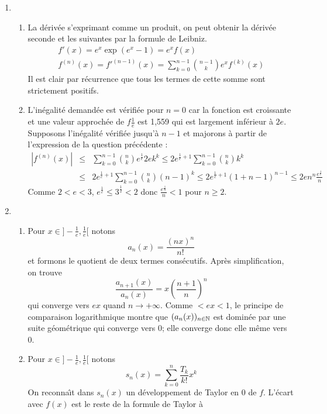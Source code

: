 \begin{enumerate}
\item \begin{enumerate}
       \item La d{\'e}riv{\'e}e s'exprimant comme un produit, on peut obtenir la d{\'e}riv{\'e}e seconde et les suivantes par la formule de Leibniz.
\begin{eqnarray*}
f'(x)=e^{x}\exp (e^{x}-1)=e^{x}f(x)\\
f^{(n)}(x)=f'^{(n-1)}(x)=\sum_{k=0}^{n-1}\binom{ n-1}{k}e^{x}f^{(k)}(x)
\end{eqnarray*}
Il est clair par r{\'e}currence que tous les termes de cette somme sont strictement positifs.
      \item L'in{\'e}galit{\'e} demand{\'e}e est v{\'e}rifi{\'e}e pour $n=0$ car la fonction est croissante et une valeur approch{\'e}e de $f\frac{1}{e}$ est 1,559 qui est largement inf{\'e}rieur {\`a} $2e$. Supposons l'in{\'e}galit{\'e} v{\'e}rifi{\'e}e jusqu'{\`a} $n-1$ et majorons {\`a} partir de l'expression de la question pr{\'e}c{\'e}dente :
\begin{eqnarray*}
|f^{(n)}(x)|&\leq& \sum _{k=0}^{n-1}\binom{n}{k}e^{\frac{1}{e}}2ek^{k}
\leq 2e^{\frac{1}{e}+1}\sum _{k=0}^{n-1}\binom{n}{k} k^{k}\\
&\leq& 2e^{\frac{1}{e}+1}\sum _{k=0}^{n-1}\binom{n}{k} (n-1)^{k}
\leq 2e^{\frac{1}{e}+1}(1+n-1)^{n-1} \leq 2en^{n}\frac{e^{\frac{1}{e}}}{n}
\end{eqnarray*}
Comme $2<e<3$, $e^{\frac{1}{e}}\leq 3^{\frac{1}{2}}<2$ donc $\frac{ e^{\frac{1}{n}}}{n} < 1$ pour $n \geq 2$.
\end{enumerate}
\item \begin{enumerate}
      \item Pour $x \in ]-\frac{1}{e},\frac{1}{e}[$ notons
$$a_{n}(x)=\frac{(nx)^{n}}{n!}$$
et formons le quotient de deux termes cons{\'e}cutifs. Apr{\`e}s simplification, on trouve
$$\frac{a_{n+1}(x)}{a_{n}(x)}=x \left(\frac{n+1}{n}\right)^{n}$$
qui converge vers $ex$ quand $n\rightarrow +\infty$. Comme $<ex<1$, le principe de comparaison logarithmique montre que $(a_n(x))_{n\in \mathbb{N}}$ est domin{\'e}e par une suite g{\'e}om{\'e}trique qui converge vers 0; elle converge donc elle m{\^e}me vers 0.
     \item Pour $x \in ]-\frac{1}{e},\frac{1}{e}[$ notons
$$s_{n}(x)= \sum_{k=0}^{n}\frac{T_{k} }{k!} x^{k}$$
On reconna{\^\i}t dans $s_{n}(x)$ un d{\'e}veloppement de Taylor en 0 de
$f$. L'{\'e}cart avec $f(x)$ est le reste de la formule de Taylor {\`a}

\end{enumerate}
\end{enumerate}

